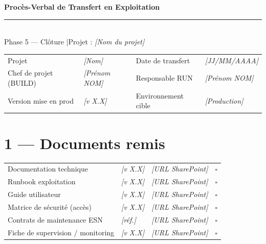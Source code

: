 \documentclass[11pt,a4paper,oneside]{report}
\begin{document}
\small

\begin{center}
{\LARGE\bfseries\color{cnNavy} Procès-Verbal de Transfert en Exploitation}\\[4pt]
\textcolor{cnOrange}{\rule{10cm}{1pt}}\\[4pt]
{\large\color{cnSlate} Phase 5 — Clôture \quad|\quad Projet : \textit{[Nom du projet]}}
\end{center}

\vspace{4pt}
\renewcommand{\arraystretch}{1.4}
\begin{tabularx}{\textwidth}{L{3.5cm} Y L{3.5cm} Y}
\toprule
{} &  &  &  \\
\midrule
Projet               & \textit{[Nom]}         & Date de transfert  & \textit{[JJ/MM/AAAA]} \\
Chef de projet (BUILD) & \textit{[Prénom NOM]} & Responsable RUN    & \textit{[Prénom NOM]} \\
Version mise en prod & \textit{[v X.X]}       & Environnement cible & \textit{[Production]} \\
\bottomrule
\end{tabularx}

\section*{1 — Documents remis}

\renewcommand{\arraystretch}{1.3}
\begin{tabularx}{\textwidth}{L{5cm} C{3cm} Y C{2.5cm}}
\toprule
{} &  &  &  \\
\midrule
Documentation technique & \textit{[v X.X]} & \textit{[URL SharePoint]} & $\square$ \\
Runbook exploitation & \textit{[v X.X]} & \textit{[URL SharePoint]} & $\square$ \\
Guide utilisateur & \textit{[v X.X]} & \textit{[URL SharePoint]} & $\square$ \\
Matrice de sécurité (accès) & \textit{[v X.X]} & \textit{[URL SharePoint]} & $\square$ \\
Contrats de maintenance ESN & \textit{[réf.]} & \textit{[URL SharePoint]} & $\square$ \\
Fiche de supervision / monitoring & \textit{[v X.X]} & \textit{[URL SharePoint]} & $\square$ \\
\bottomrule
\end{tabularx}
\end{document}
